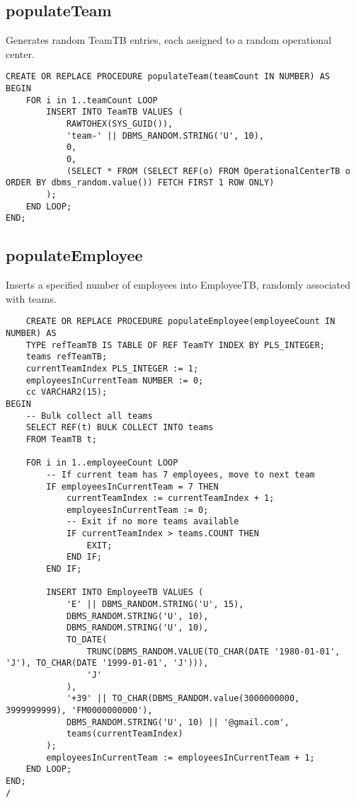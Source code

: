 \subsection*{populateTeam}
Generates random TeamTB entries, each assigned to a random operational center.
\begin{lstlisting}
CREATE OR REPLACE PROCEDURE populateTeam(teamCount IN NUMBER) AS
BEGIN
    FOR i in 1..teamCount LOOP
        INSERT INTO TeamTB VALUES (
            RAWTOHEX(SYS_GUID()),
            'team-' || DBMS_RANDOM.STRING('U', 10),
            0,
            0,
            (SELECT * FROM (SELECT REF(o) FROM OperationalCenterTB o ORDER BY dbms_random.value()) FETCH FIRST 1 ROW ONLY)
        );
    END LOOP;
END;
\end{lstlisting}

\subsection*{populateEmployee}
Inserts a specified number of employees into EmployeeTB, randomly associated with teams.
\begin{lstlisting}
    CREATE OR REPLACE PROCEDURE populateEmployee(employeeCount IN NUMBER) AS
    TYPE refTeamTB IS TABLE OF REF TeamTY INDEX BY PLS_INTEGER;
    teams refTeamTB;
    currentTeamIndex PLS_INTEGER := 1;
    employeesInCurrentTeam NUMBER := 0;
    cc VARCHAR2(15);
BEGIN
    -- Bulk collect all teams
    SELECT REF(t) BULK COLLECT INTO teams
    FROM TeamTB t;

    FOR i in 1..employeeCount LOOP
        -- If current team has 7 employees, move to next team
        IF employeesInCurrentTeam = 7 THEN
            currentTeamIndex := currentTeamIndex + 1;
            employeesInCurrentTeam := 0;
            -- Exit if no more teams available
            IF currentTeamIndex > teams.COUNT THEN
                EXIT;
            END IF;
        END IF;

        INSERT INTO EmployeeTB VALUES (
            'E' || DBMS_RANDOM.STRING('U', 15),
            DBMS_RANDOM.STRING('U', 10),
            DBMS_RANDOM.STRING('U', 10),
            TO_DATE(
                TRUNC(DBMS_RANDOM.VALUE(TO_CHAR(DATE '1980-01-01', 'J'), TO_CHAR(DATE '1999-01-01', 'J'))),
                'J'
            ),
            '+39' || TO_CHAR(DBMS_RANDOM.value(3000000000, 3999999999), 'FM0000000000'),
            DBMS_RANDOM.STRING('U', 10) || '@gmail.com',
            teams(currentTeamIndex)
        );
        employeesInCurrentTeam := employeesInCurrentTeam + 1;
    END LOOP;
END;
/
\end{lstlisting}

